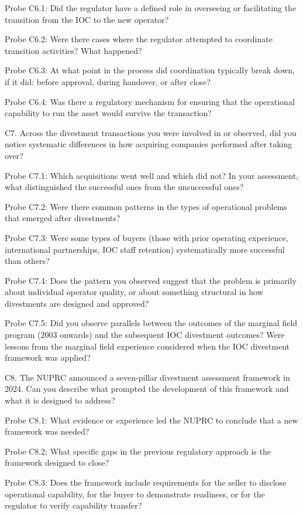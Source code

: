 \documentclass[twoside,fontset=lmodern]{mitthesis}
\begin{document}
Probe C6.1: Did the regulator have a defined role in overseeing or
facilitating the transition from the IOC to the new operator?

Probe C6.2: Were there cases where the regulator attempted to coordinate
transition activities? What happened?

Probe C6.3: At what point in the process did coordination typically
break down, if it did: before approval, during handover, or after close?

Probe C6.4: Was there a regulatory mechanism for ensuring that the
operational capability to run the asset would survive the transaction?

C7. Across the divestment transactions you were involved in or observed,
did you notice systematic differences in how acquiring companies
performed after taking over?

Probe C7.1: Which acquisitions went well and which did not? In your
assessment, what distinguished the successful ones from the unsuccessful
ones?

Probe C7.2: Were there common patterns in the types of operational
problems that emerged after divestments?

Probe C7.3: Were some types of buyers (those with prior operating
experience, international partnerships, IOC staff retention)
systematically more successful than others?

Probe C7.4: Does the pattern you observed suggest that the problem is
primarily about individual operator quality, or about something
structural in how divestments are designed and approved?

Probe C7.5: Did you observe parallels between the outcomes of the
marginal field program (2003 onwards) and the subsequent IOC divestment
outcomes? Were lessons from the marginal field experience considered
when the IOC divestment framework was applied?

C8. The NUPRC announced a seven-pillar divestment assessment framework
in 2024. Can you describe what prompted the development of this
framework and what it is designed to address?

Probe C8.1: What evidence or experience led the NUPRC to conclude that a
new framework was needed?

Probe C8.2: What specific gaps in the previous regulatory approach is
the framework designed to close?

Probe C8.3: Does the framework include requirements for the seller to
disclose operational capability, for the buyer to demonstrate readiness,
or for the regulator to verify capability transfer?
\end{document}
